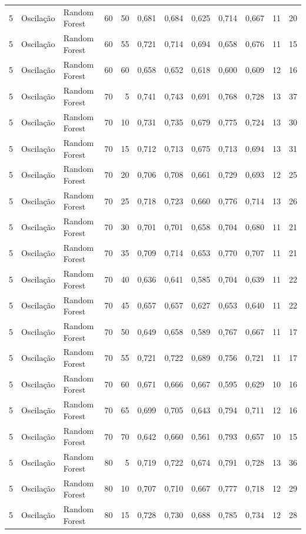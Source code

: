 \begin{longtable}{@{}rllrrrrrrrrr@{}}
5 & Oscilação & Random Forest & 60 & 50 & 0,681 & 0,684 & 0,625 & 0,714 & 0,667 & 11 & 20 \\
5 & Oscilação & Random Forest & 60 & 55 & 0,721 & 0,714 & 0,694 & 0,658 & 0,676 & 11 & 15 \\
5 & Oscilação & Random Forest & 60 & 60 & 0,658 & 0,652 & 0,618 & 0,600 & 0,609 & 12 & 16 \\
5 & Oscilação & Random Forest & 70 & 5 & 0,741 & 0,743 & 0,691 & 0,768 & 0,728 & 13 & 37 \\
5 & Oscilação & Random Forest & 70 & 10 & 0,731 & 0,735 & 0,679 & 0,775 & 0,724 & 13 & 30 \\
5 & Oscilação & Random Forest & 70 & 15 & 0,712 & 0,713 & 0,675 & 0,713 & 0,694 & 13 & 31 \\
5 & Oscilação & Random Forest & 70 & 20 & 0,706 & 0,708 & 0,661 & 0,729 & 0,693 & 12 & 25 \\
5 & Oscilação & Random Forest & 70 & 25 & 0,718 & 0,723 & 0,660 & 0,776 & 0,714 & 13 & 26 \\
5 & Oscilação & Random Forest & 70 & 30 & 0,701 & 0,701 & 0,658 & 0,704 & 0,680 & 11 & 21 \\
5 & Oscilação & Random Forest & 70 & 35 & 0,709 & 0,714 & 0,653 & 0,770 & 0,707 & 11 & 21 \\
5 & Oscilação & Random Forest & 70 & 40 & 0,636 & 0,641 & 0,585 & 0,704 & 0,639 & 11 & 22 \\
5 & Oscilação & Random Forest & 70 & 45 & 0,657 & 0,657 & 0,627 & 0,653 & 0,640 & 11 & 22 \\
5 & Oscilação & Random Forest & 70 & 50 & 0,649 & 0,658 & 0,589 & 0,767 & 0,667 & 11 & 17 \\
5 & Oscilação & Random Forest & 70 & 55 & 0,721 & 0,722 & 0,689 & 0,756 & 0,721 & 11 & 17 \\
5 & Oscilação & Random Forest & 70 & 60 & 0,671 & 0,666 & 0,667 & 0,595 & 0,629 & 10 & 16 \\
5 & Oscilação & Random Forest & 70 & 65 & 0,699 & 0,705 & 0,643 & 0,794 & 0,711 & 12 & 16 \\
5 & Oscilação & Random Forest & 70 & 70 & 0,642 & 0,660 & 0,561 & 0,793 & 0,657 & 10 & 15 \\
5 & Oscilação & Random Forest & 80 & 5 & 0,719 & 0,722 & 0,674 & 0,791 & 0,728 & 13 & 36 \\
5 & Oscilação & Random Forest & 80 & 10 & 0,707 & 0,710 & 0,667 & 0,777 & 0,718 & 12 & 29 \\
5 & Oscilação & Random Forest & 80 & 15 & 0,728 & 0,730 & 0,688 & 0,785 & 0,734 & 12 & 28 \\

\end{longtable}
